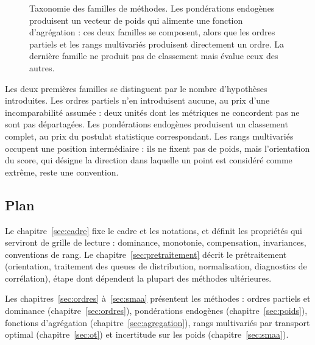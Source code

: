 \documentclass[11pt,a4paper]{article}
\theoremstyle{definition}
\theoremstyle{remark}
\begin{document}
\begin{figure}[htbp]
  \caption{Taxonomie des familles de méthodes. Les pondérations endogènes produisent un
  vecteur de poids qui alimente une fonction d'agrégation : ces deux familles se composent,
  alors que les ordres partiels et les rangs multivariés produisent directement un ordre.
  La dernière famille ne produit pas de classement mais évalue ceux des autres.}
  \label{fig:taxonomie}
\end{figure}

\bigskip

Les deux premières familles se distinguent par le nombre d'hypothèses introduites. Les
ordres partiels n'en introduisent aucune, au prix d'une incomparabilité assumée : deux
unités dont les métriques ne concordent pas ne sont pas départagées. Les pondérations
endogènes produisent un classement complet, au prix du postulat statistique correspondant.
Les rangs multivariés occupent une position intermédiaire : ils ne fixent pas de poids,
mais l'orientation du score, qui désigne la direction dans laquelle un point est considéré
comme extrême, reste une convention.

\bigskip

\subsection{Plan}

\medskip

Le chapitre~\ref{sec:cadre} fixe le cadre et les notations, et définit les propriétés qui
serviront de grille de lecture : dominance, monotonie, compensation, invariances,
conventions de rang. Le chapitre~\ref{sec:pretraitement} décrit le prétraitement
(orientation, traitement des queues de distribution, normalisation, diagnostics de
corrélation), étape dont dépendent la plupart des méthodes ultérieures.

\medskip

Les chapitres~\ref{sec:ordres} à~\ref{sec:smaa} présentent les méthodes :
ordres partiels et dominance (chapitre~\ref{sec:ordres}), pondérations endogènes
(chapitre~\ref{sec:poids}), fonctions d'agrégation (chapitre~\ref{sec:agregation}), rangs
multivariés par transport optimal (chapitre~\ref{sec:ot}) et incertitude sur les poids
(chapitre~\ref{sec:smaa}).
\end{document}
